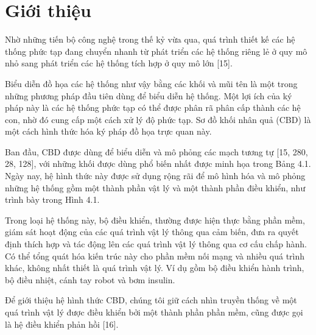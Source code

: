 \section{Giới thiệu}
Nhờ những tiến bộ công nghệ trong thế kỷ vừa qua, quá trình thiết kế các hệ thống phức tạp đang chuyển nhanh từ phát triển các hệ thống riêng lẻ ở quy mô nhỏ sang phát triển các hệ thống tích hợp ở quy mô lớn [15].

Biểu diễn đồ họa các hệ thống như vậy bằng các khối và mũi tên là một trong những phương pháp đầu tiên dùng để biểu diễn hệ thống. Một lợi ích của ký pháp này là các hệ thống phức tạp có thể được phân rã phân cấp
thành các hệ con, nhờ đó cung cấp một cách xử lý độ phức tạp. Sơ đồ khối nhân quả (CBD) là một cách hình thức hóa ký pháp đồ họa trực quan này.

Ban đầu, CBD được dùng để biểu diễn và mô phỏng các mạch tương tự [15, 280, 28, 128], với những khối được dùng phổ biến nhất được minh họa trong Bảng 4.1. Ngày nay, hệ hình thức này được sử dụng rộng rãi để mô hình hóa và mô phỏng những hệ thống gồm một thành phần vật lý và một thành phần điều khiển, như trình bày trong Hình 4.1.

Trong loại hệ thống này, bộ điều khiển, thường được hiện thực bằng phần mềm, giám sát hoạt động của các quá trình vật lý thông qua cảm biến, đưa ra quyết định thích hợp và tác động lên các quá trình vật lý thông qua cơ cấu chấp hành. Có thể tổng quát hóa kiến trúc này cho phần mềm nối mạng và nhiều quá trình khác, không nhất thiết là quá trình vật lý. Ví dụ gồm bộ điều khiển hành trình, bộ điều nhiệt, cánh tay robot và bơm insulin.

Để giới thiệu hệ hình thức CBD, chúng tôi giữ cách nhìn truyền thống về một quá trình vật lý được điều khiển bởi một thành phần phần mềm, cũng được gọi là hệ điều khiển phản hồi [16].

